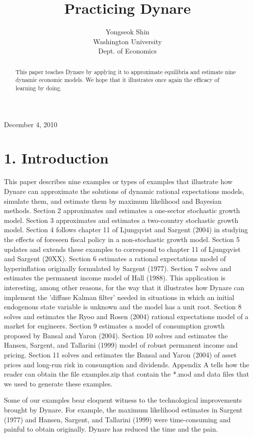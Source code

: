\documentclass[10pt]{article}
\title{Practicing Dynare }
\author{Yongseok Shin\\
Washington University\\
Dept. of Economics}
\date{}
\begin{document}
\maketitle
\captionsetup{singlelinecheck=false}
December 4, 2010

\begin{abstract}
This paper teaches Dynare by applying it to approximate equilibria and estimate nine dynamic economic models. We hope that it illustrates once again the efficacy of learning by doing.
\end{abstract}

\section*{1. Introduction}
This paper describes nine examples or types of examples that illustrate how Dynare can approximate the solutions of dynamic rational expectations models, simulate them, and estimate them by maximum likelihood and Bayesian methods. Section 2 approximates and estimates a one-sector stochastic growth model. Section 3 approximates and estimates a two-country stochastic growth model. Section 4 follows chapter 11 of Ljungqvist and Sargent (2004) in studying the effects of foreseen fiscal policy in a non-stochastic growth model. Section 5 updates and extends these examples to correspond to chapter 11 of Ljungqvist and Sargent (20XX). Section 6 estimates a rational expectations model of hyperinflation originally formulated by Sargent (1977). Section 7 solves and estimates the permanent income model of Hall (1988). This application is interesting, among other reasons, for the way that it illustrates how Dynare can implement the 'diffuse Kalman filter' needed in situations in which an initial endogenous state variable is unknown and the model has a unit root. Section 8 solves and estimates the Ryoo and Rosen (2004) rational expectations model of a market for engineers. Section 9 estimates a model of consumption growth proposed by Bansal and Yaron (2004). Section 10 solves and estimates the Hansen, Sargent, and Tallarini (1999) model of robust permanent income and pricing. Section 11 solves and estimates the Bansal and Yaron (2004) of asset prices and long-run risk in consumption and dividends. Appendix A tells how the reader can obtain the file examples.zip that contain the *.mod and data files that we used to generate these examples.

Some of our examples bear eloquent witness to the technological improvements brought by Dynare. For example, the maximum likelihood estimates in Sargent (1977) and Hansen, Sargent, and Tallarini (1999) were time-consuming and painful to obtain originally. Dynare has reduced the time and the pain.
\end{document}

